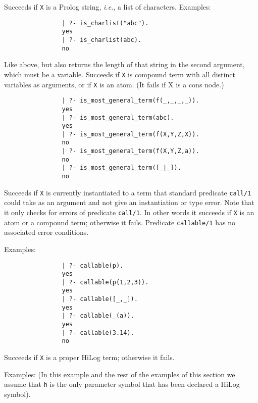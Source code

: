 \begin{description}
    Succeeds if {\tt X} is a Prolog string, {\it i.e.}, a list of
    characters.
    Examples:
    {\footnotesize
     \begin{verbatim}
                | ?- is_charlist("abc").
                yes
                | ?- is_charlist(abc).
                no
     \end{verbatim}}
    Like above, but also returns the length of that string in the second
    argument, which must be a variable.
    Succeeds if {\tt X} is compound term with all distinct variables
as arguments, or if {\tt X} is an atom. (It fails if X is a cons node.)
    {\footnotesize
     \begin{verbatim}
                | ?- is_most_general_term(f(_,_,_,_)).
                yes
                | ?- is_most_general_term(abc).
                yes
                | ?- is_most_general_term(f(X,Y,Z,X)).
                no
                | ?- is_most_general_term(f(X,Y,Z,a)).
                no
                | ?- is_most_general_term([_|_]).
                no
     \end{verbatim}}

    Succeeds if {\tt X} is currently instantiated to a term that standard
    predicate {\tt call/1} could take as an argument and not give an 
    instantiation or type error.  Note that it only checks for errors of
    predicate {\tt call/1}.  In other words it succeeds if {\tt X}
    is an atom or a compound term; otherwise it fails.  Predicate
    {\tt callable/1} has no associated error conditions.

    Examples:
    {\footnotesize
     \begin{verbatim}
                | ?- callable(p).
                yes
                | ?- callable(p(1,2,3)).
                yes
                | ?- callable([_,_]).
                yes
                | ?- callable(_(a)).
                yes
                | ?- callable(3.14).
                no
     \end{verbatim}}

    Succeeds if {\tt X} is a proper HiLog term; otherwise it fails.

    Examples:
    (In this example and the rest of the examples of this section we assume
     that {\tt h} is the only parameter symbol that has been declared a HiLog
     symbol).


\end{description}

